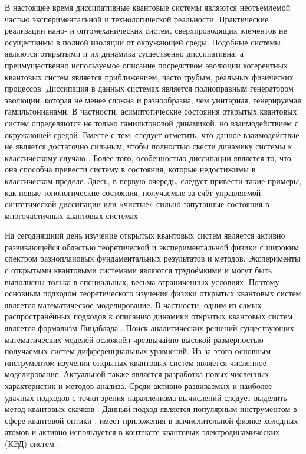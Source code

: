 
{\actuality} 
В настоящее время диссипативные квантовые системы являются неотъемлемой частью экспериментальной и технологической реальности.
Практические реализации нано- и оптомеханических систем, сверхпроводящих элементов не осуществимы в полной изоляции от окружающей среды.
Подобные системы являются открытыми и их динамика существенно диссипативна, а преимущественно используемое описание посредством эволюции когерентных квантовых систем является приближением, часто грубым, реальных физических процессов.
Диссипация в данных системах является полноправным генератором эволюции, которая не менее сложна и разнообразна, чем унитарная, генерируемая гамильтонианами.
В частности, асимптотические состояния открытых квантовых систем определяются не только гамильтоновой динамикой, но взаимодействием с окружающей средой.
Вместе с тем, следует отметить, что данное взаимодействие не является достаточно сильным, чтобы полностью свести динамику системы к классическому случаю \autocite{Breuer2007}.
Более того, особенностью диссипации является то, что она способна привести систему в состояния, которые недостижимы в классическом пределе.
Здесь, в первую очередь, следует привести такие примеры, как новые топологические состояния, получаемые за счёт управляемой синтетической диссипации \autocite{Diehl2011} или «чистые» сильно запутанные состояния в многочастичных квантовых системах \autocite{Kraus2008}.

На сегодняшний день изучение открытых квантовых систем является активно развивающейся областью теоретической и экспериментальной физики с широким спектром разноплановых фундаментальных результатов и методов.
Эксперименты с открытыми квантовыми системами являются трудоёмкими и могут быть выполнены только в специальных, весьма ограниченных условиях.
Поэтому основным подходом теоретического изучения физики открытых квантовых систем является математическое моделирование.
В частности, одним из самых распространённых подходов к описанию динамики открытых квантовых систем является формализм Линдблада \autocite{Lindblad1976}.
Поиск аналитических решений существующих математических моделей осложнён чрезвычайно высокой размерностью получаемых систем дифференциальных уравнений.
Из-за этого основным инструментом изучения открытых квантовых систем является численное моделирование.
Актуальной также является разработка новых численных характеристик и методов анализа.
Среди активно развиваемых и наиболее удачных подходов с точки зрения параллелизма вычислений следует выделить метод квантовых скачков \autocite{Dalibard1992}.
Данный подход является популярным инструментом в сфере квантовой оптики \autocite{Carmichael1993}, имеет приложения в вычислительной физике холодных атомов \autocite{Diehl2011} и активно используется в контексте квантовых электродинамических (КЭД) систем \autocite{Arakawa2015}.

